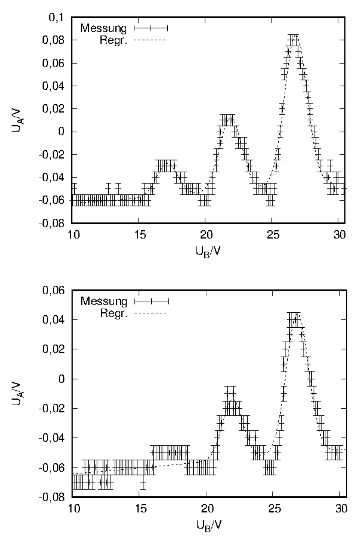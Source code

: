 \newpage

\begin{figure}[!h]
  \centering
  \begin{subfigure}[h]{0.5\textwidth}
    \centering
    \includegraphics{data/fh/168K4V.eps}
  \end{subfigure}%
  \begin{subfigure}[h]{0.5\textwidth}
    \centering
    \includegraphics{data/fh/173K4V.eps}
  \end{subfigure}
    \begin{subfigure}[h]{0.5\textwidth}
    \centering

\end{subfigure}
\end{figure}
